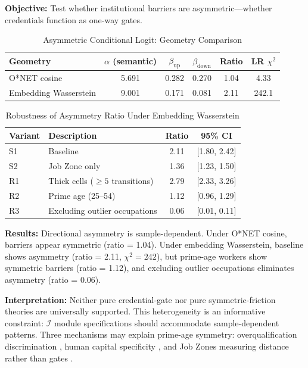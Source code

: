 \documentclass[12pt]{article}
\begin{document}
\textbf{Objective:} Test whether institutional barriers are asymmetric---whether credentials function as one-way gates.


\begin{table}[h!]
\centering
\caption{Asymmetric Conditional Logit: Geometry Comparison}
\label{tab:asymmetric-geometry}
\begin{tabular}{lccccc}
\toprule
\textbf{Geometry} & $\alpha$ (semantic) & $\beta_{\mathrm{up}}$ & $\beta_{\mathrm{down}}$ & Ratio & LR $\chi^2$ \\
\midrule
O*NET cosine & 5.691 & 0.282 & 0.270 & 1.04 & 4.33 \\
Embedding Wasserstein & 9.001 & 0.171 & 0.081 & 2.11 & 242.1 \\
\bottomrule
\end{tabular}
\end{table}


\begin{table}[h!]
\centering
\caption{Robustness of Asymmetry Ratio Under Embedding Wasserstein}
\label{tab:asymmetric-robustness}
\begin{tabular}{llcc}
\toprule
\textbf{Variant} & \textbf{Description} & \textbf{Ratio} & \textbf{95\% CI} \\
\midrule
S1 & Baseline & 2.11 & [1.80, 2.42] \\
S2 & Job Zone only & 1.36 & [1.23, 1.50] \\
R1 & Thick cells ($\geq 5$ transitions) & 2.79 & [2.33, 3.26] \\
R2 & Prime age (25--54) & 1.12 & [0.96, 1.29] \\
R3 & Excluding outlier occupations & 0.06 & [0.01, 0.11] \\
\bottomrule
\end{tabular}
\end{table}


\textbf{Results:} Directional asymmetry is sample-dependent. Under O*NET cosine, barriers appear symmetric (ratio = 1.04). Under embedding Wasserstein, baseline shows asymmetry (ratio = 2.11, $\chi^2 = 242$), but prime-age workers show symmetric barriers (ratio = 1.12), and excluding outlier occupations eliminates asymmetry (ratio = 0.06).

\textbf{Interpretation:} Neither pure credential-gate nor pure symmetric-friction theories are universally supported. This heterogeneity is an informative constraint: $\mathcal{I}$ module specifications should accommodate sample-dependent patterns. Three mechanisms may explain prime-age symmetry: overqualification discrimination \citep{Pedulla2016}, human capital specificity \citep{KambourovManovskii2009,GathmannSchonberg2010}, and Job Zones measuring distance rather than gates \citep{KleinerXu2020}.
\end{document}
